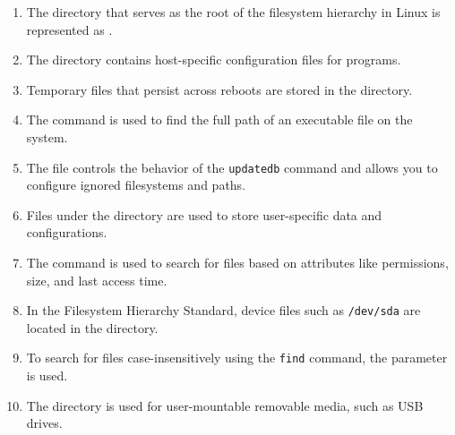 \documentclass[a4paper]{report}
\begin{document}
\begin{enumerate}[1.]
    \item The directory that serves as the root of the filesystem hierarchy in Linux is represented as \underline{\hspace{2cm}}.
    
    \item The \underline{\hspace{2cm}} directory contains host-specific configuration files for programs.
    
    \item Temporary files that persist across reboots are stored in the \underline{\hspace{2cm}} directory.
    
    \item The command \underline{\hspace{2cm}} is used to find the full path of an executable file on the system.
    
    \item The \underline{\hspace{2cm}} file controls the behavior of the \texttt{updatedb} command and allows you to configure ignored filesystems and paths.
    
    \item Files under the \underline{\hspace{2cm}} directory are used to store user-specific data and configurations.
    
    \item The \underline{\hspace{2cm}} command is used to search for files based on attributes like permissions, size, and last access time.
    
    \item In the Filesystem Hierarchy Standard, device files such as \texttt{/dev/sda} are located in the \underline{\hspace{2cm}} directory.
    
    \item To search for files case-insensitively using the \texttt{find} command, the parameter \underline{\hspace{2cm}} is used.
    
    \item The directory \underline{\hspace{2cm}} is used for user-mountable removable media, such as USB drives.
    \end{enumerate}
\end{document}
